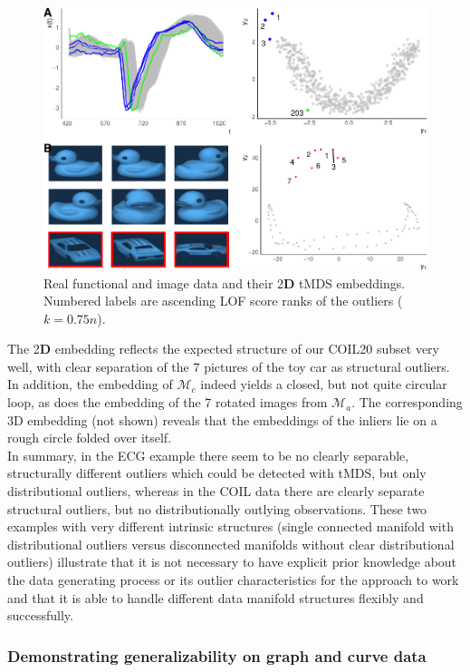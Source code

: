 \documentclass[
  10pt]{article}
\newcommand{\vizdim}{\mathbf{D}}        %
\newcommand{\co}{c}
\newcommand{\an}{a}
\newcommand{\Min}{\mathcal{M}_{\co}}
\newcommand{\Man}{\mathcal{M}_{\an}}
\begin{document}
\begin{figure}
\centering
\includegraphics{00_paper_wires_files/figure-latex/fda-image-real-1.pdf}
\caption{\label{fig:fda-image-real}\label{fig:fda-image-real} Real functional and image data and their 2\(\vizdim\) tMDS embeddings. Numbered labels are ascending LOF score ranks of the outliers (\(k = 0.75n\)).}
\end{figure}

The 2\(\vizdim\) embedding reflects the expected structure of our COIL20 subset very well, with clear separation of the \(7\) pictures of the toy car as structural outliers. In addition, the embedding of \(\Min\) indeed yields a closed, but not quite circular loop, as does the embedding of the 7 rotated images from \(\Man\). The corresponding 3D embedding (not shown) reveals that the embeddings of the inliers lie on a rough circle folded over itself.
\\
In summary, in the ECG example there seem to be no clearly separable, structurally different outliers which could be detected with tMDS, but only distributional outliers, whereas in the COIL data there are clearly separate structural outliers, but no distributionally outlying observations. These two examples with very different intrinsic structures (single connected manifold with distributional outliers versus disconnected manifolds without clear distributional outliers) illustrate that it is not necessary to have explicit prior knowledge about the data generating process or its outlier characteristics for the approach to work and that it is able to handle different data manifold structures flexibly and successfully.

\subsubsection{Demonstrating generalizability on graph and curve data}
\end{document}
